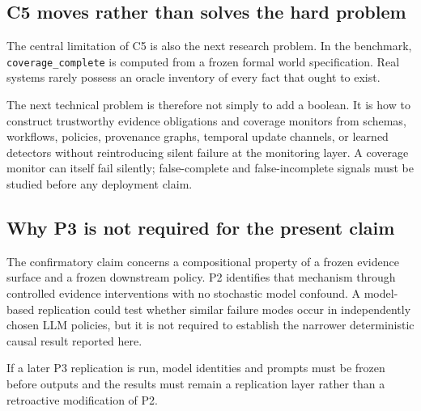 \subsection{C5 moves rather than solves the hard problem}

The central limitation of C5 is also the next research problem. In the benchmark,
\texttt{coverage\_complete} is computed from a frozen formal world specification. Real
systems rarely possess an oracle inventory of every fact that ought to exist.

The next technical problem is therefore not simply to add a boolean. It is how to
construct trustworthy evidence obligations and coverage monitors from schemas, workflows,
policies, provenance graphs, temporal update channels, or learned detectors without
reintroducing silent failure at the monitoring layer. A coverage monitor can itself fail
silently; false-complete and false-incomplete signals must be studied before any deployment
claim.

\subsection{Why P3 is not required for the present claim}

The confirmatory claim concerns a compositional property of a frozen evidence surface and a
frozen downstream policy. P2 identifies that mechanism through controlled evidence
interventions with no stochastic model confound. A model-based replication could test
whether similar failure modes occur in independently chosen LLM policies, but it is not
required to establish the narrower deterministic causal result reported here.

If a later P3 replication is run, model identities and prompts must be frozen before
outputs and the results must remain a replication layer rather than a retroactive
modification of P2.
